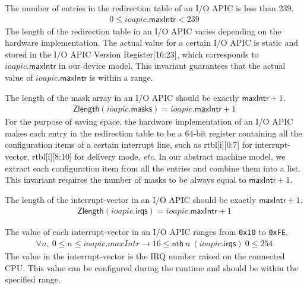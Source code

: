 \begin{invariant}
The number of entries in the redirection table of an I/O APIC is less than 239.
\begin{align*}
0 \leq ioapic.\textsf{maxIntr} < 239
\end{align*}
\noindent{}\textnormal{The length of the redirection table in an I/O APIC varies
	depending on the hardware implementation. The actual value for a certain I/O
	APIC is static and stored in the I/O APIC Version Register[16:23], which
	corresponds to $ioapic.\textsf{maxIntr}$ in our device model. This invariant
	guarantees that the actual value of $ioapic.\textsf{maxIntr}$ is within a range.
}
\end{invariant}

\begin{invariant}
	The length of the mask array in an I/O APIC should be exactly $\textsf{maxIntr} + 1$.
\begin{align*}
\textsf{Zlength} (ioapic.\textsf{masks}) = ioapic.\textsf{maxIntr} + 1
\end{align*}
\noindent\textnormal{For the purpose of saving space, the hardware
	implementation of an I/O APIC makes each entry in the redirection table to be a
	64-bit register containing all the configuration items of a certain interrupt
	line, such as rtbl[i][0:7] for interrupt-vector, rtbl[i][8:10] for delivery
	mode, {\it etc}. In our abstract machine model, we extract each configuration
	item from all the entries and combine them into a list. This invariant requires
	the number of masks to be always equal to $\textsf{maxIntr} + 1$.}
\end{invariant}

\begin{invariant}
	The length of the interrupt-vector in an I/O APIC should be exactly
$\textsf{maxIntr} + 1$.
\begin{align*}
\textsf{Zlength} (ioapic.\textsf{irqs}) = ioapic.\textsf{maxIntr} + 1
\end{align*}
\end{invariant}

\begin{invariant}
	The value of each interrupt-vector in an I/O APIC ranges from \texttt{0x10} to \texttt{0xFE}.
\begin{align*}
\forall n,~ 0 \le n \le ioapic.maxIntr \rightarrow 16 \leq \textsf{nth}~ n~ (ioapic.\textsf{irqs})~ 0 \leq 254
\end{align*}
\noindent\textnormal{The value in the interrupt-vector is the IRQ number raised
	on the connected CPU. This value can be configured during the runtime and
	should be within the specified range.}
\end{invariant}

